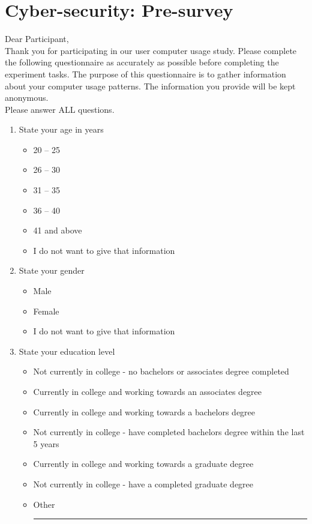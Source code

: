 \chapter{Cyber-security: Pre-survey}
\label{apx:cypre}
Dear Participant,\\
Thank you for participating in our user computer usage study. Please complete the following questionnaire as accurately as possible before completing the experiment tasks. The purpose of this questionnaire is to gather information about your computer usage patterns. The information you provide will be kept anonymous.\\
Please answer ALL questions.

\begin{enumerate}[topsep=-4em]
\item State your age in years
\begin{itemize}[topsep=-6em, label={o}]
\itemsep-1em 
\item 20 -- 25
\item 26 -- 30
\item 31 -- 35
\item 36 -- 40
\item 41 and above
\item I do not want to give that information
\end{itemize}
\item State your gender
\begin{itemize}[topsep=-6em, label={o}]
\itemsep-1em 
\item Male
\item Female
\item I do not want to give that information
\end{itemize}
\item State your education level
\begin{itemize}[topsep=-6em, label={o}]
\itemsep-1em 
\item Not currently in college - no bachelors or associates degree completed
\item Currently in college and working towards an associates degree
\item Currently in college and working towards a bachelors degree
\item Not currently in college - have completed bachelors degree within the last 5 years
\item Currently in college and working towards a graduate degree
\item Not currently in college - have a completed graduate degree
\item Other \rule{4cm}{0.4pt}

\end{itemize}
\end{enumerate}

